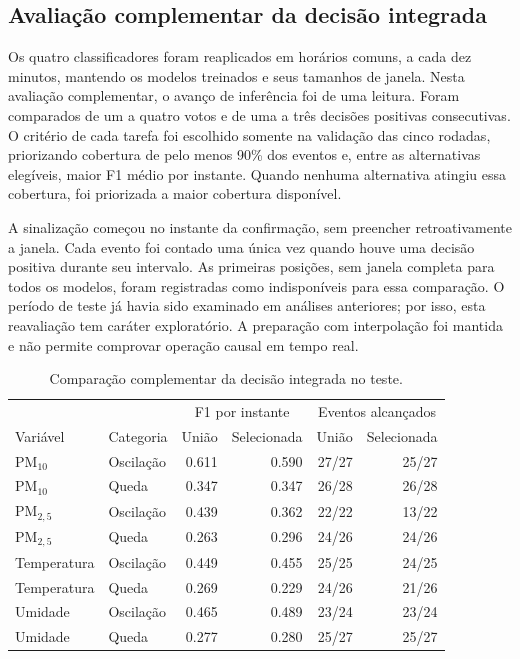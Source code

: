 \subsection{Avaliação complementar da decisão integrada}
\label{sec:avaliacao_integracao_sincronizada}

Os quatro classificadores foram reaplicados em horários comuns,
a cada dez minutos, mantendo os modelos treinados e seus tamanhos
de janela. Nesta avaliação complementar, o avanço de inferência
foi de uma leitura. Foram comparados de um a quatro votos e de
uma a três decisões positivas consecutivas. O critério de cada
tarefa foi escolhido somente na validação das cinco rodadas,
priorizando cobertura de pelo menos 90\% dos eventos e, entre
as alternativas elegíveis, maior F1 médio por instante. Quando
nenhuma alternativa atingiu essa cobertura, foi priorizada a
maior cobertura disponível.

A sinalização começou no instante da confirmação, sem preencher
retroativamente a janela. Cada evento foi contado uma única vez
quando houve uma decisão positiva durante seu intervalo. As
primeiras posições, sem janela completa para todos os modelos,
foram registradas como indisponíveis para essa comparação. O
período de teste já havia sido examinado em análises anteriores;
por isso, esta reavaliação tem caráter exploratório. A preparação
com interpolação foi mantida e não permite comprovar operação
causal em tempo real.

\begin{table}[H]
\centering
\caption[Comparação complementar da decisão integrada]
{Comparação complementar da decisão integrada no teste.}
\label{tab:integracao_sincronizada_complementar}
\footnotesize
\setlength{\tabcolsep}{4pt}
\begin{tabular}{llrrrr}
\toprule
 & & \multicolumn{2}{c}{F1 por instante} & \multicolumn{2}{c}{Eventos alcançados} \\
Variável & Categoria & União & Selecionada & União & Selecionada \\
\midrule
PM$_{10}$ & Oscilação & 0.611 & 0.590 & 27/27 & 25/27 \\
PM$_{10}$ & Queda & 0.347 & 0.347 & 26/28 & 26/28 \\
PM$_{2,5}$ & Oscilação & 0.439 & 0.362 & 22/22 & 13/22 \\
PM$_{2,5}$ & Queda & 0.263 & 0.296 & 24/26 & 24/26 \\
Temperatura & Oscilação & 0.449 & 0.455 & 25/25 & 24/25 \\
Temperatura & Queda & 0.269 & 0.229 & 24/26 & 21/26 \\
Umidade & Oscilação & 0.465 & 0.489 & 23/24 & 23/24 \\
Umidade & Queda & 0.277 & 0.280 & 25/27 & 25/27 \\
\bottomrule
\end{tabular}
\end{table}

